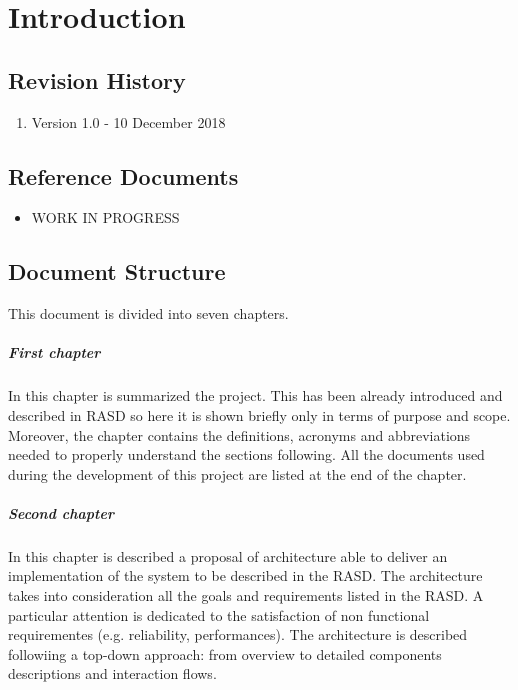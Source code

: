 \documentclass[../DD.tex]{subfiles}
\begin{document}
\chapter{Introduction}
\thispagestyle{fancy}
		
		
		
		
		
		\section{Revision History}
		\begin{enumerate}
			\item Version 1.0 - 10 December 2018
		\end{enumerate}
		
		\section{Reference Documents}
			\begin{itemize}
				\item {WORK IN PROGRESS}
			\end{itemize}
			
		\section{Document Structure}
		This document is divided into seven chapters.
		
		\paragraph{First chapter} 
			 In this chapter is summarized the project. This has been already introduced and described in RASD so here it is shown briefly only in terms of purpose and scope. Moreover, the chapter contains the deﬁnitions, acronyms and abbreviations needed to properly understand the sections following. All the documents used during the development of this project are listed at the end of the chapter.
		\paragraph{Second chapter}
			In this chapter is described a proposal of architecture able to deliver an implementation of the system to be described in the RASD. The architecture takes into consideration all the goals and requirements listed in the RASD. A particular attention is dedicated to the satisfaction of non functional requirementes (e.g. reliability, performances). The architecture is described followiing a top-down approach: from overview to detailed components descriptions and interaction flows.
\end{document}
